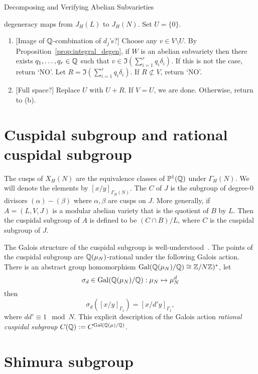 \begin{algorithm}{Decomposing and Verifying Abelian Subvarieties}
\begin{enumerate}
            degeneracy maps from $J_H(L)$ to $J_H(N)$.  Set $U=\{0\}$.
            \begin{enumerate}
                \item{} [Image of $\mathbb{Q}$-combination of $d_j$'s?]
                    Choose any $v\in V\setminus U$. By
                    Proposition~\ref{prop:integral_degen}, if $W$ is an abelian
                    subvariety then there exists $q_1,\ldots,q_r\in \mathbb{Q}$
                    such that $v\in \Im \left(\sum_{i=1} ^r q_i
                    \delta_i\right)$. If this is not the case, return
                    `NO'. Let $R = \Im \left(\sum_{i=1} ^r q_i
                    \delta_i\right)$. If $R\not\subset V$, return `NO'.
                \item{} [Full space?]
                    Replace $U$ with $U+R$. If $V=U$, we are done. Otherwise,
                    return to (b).
            \end{enumerate}
    \end{enumerate}
\end{algorithm}
\section{Cuspidal subgroup and rational cuspidal subgroup}

The cusps of $X_H(N)$ are the equivalence classes of $\mathbb{P}^1(\mathbb{Q})$ under
$\Gamma_H(N)$. We will denote the elements by $[x/y]_{\Gamma_H(N)}$. The
 $C$ of $J$ is the subgroup of degree-0 divisors
$(\alpha)-(\beta)$ where $\alpha, \beta$ are cusps on $J$. More generally, if
$A=(L, V, J)$ is a modular abelian variety that is the quotient of $B$ by $L$.
Then the cuspidal subgroup of $A$ is defined to be $(C\cap B)/L$, where $C$ is
the cuspidal subgroup of $J$.

The Galois structure of the cuspidal subgroup is well-understood~\cite[\S
1.3]{stevens:thesis}. The points of the cuspidal subgroup are
$\mathbb{Q}(\mu_N)$-rational under the following Galois action. There is an abstract
group homomorphism $\operatorname{Gal}(\mathbb{Q}(\mu_N)/\mathbb{Q})\cong \mathbb{Z}/N\mathbb{Z})^*$, let
\[
    \sigma_d\in \operatorname{Gal}(\mathbb{Q}(\mu_N)/\mathbb{Q}):\mu_N\mapsto \mu_N ^d
\]
then
\[
    \sigma_d([x/y]_{\Gamma_1})=[x/d'y]_{\Gamma_1},
\]
where $dd'\equiv 1 \mod{N}$. This explicit description of the Galois action
\emph{rational cuspidal subgroup} $C(\mathbb{Q}):=C^{\operatorname{Gal}(\mathbb{Q}(\mu)/\mathbb{Q})}$.

\section{Shimura subgroup}


